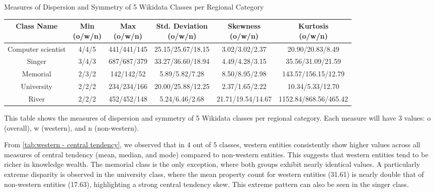 \begin{center}
\scriptsize
\begin{threeparttable}
\captionsetup{font=small}
\caption{Measures of Dispersion and Symmetry of 5 Wikidata Classes per Regional Category}
\label{tab:western - dispersion and symmetry}
\begin{tabular}{c | c c c c c} 

\toprule
    Class Name & \CellWithForceBreak{Min \\ (o/w/n)} & \CellWithForceBreak{Max \\ (o/w/n)} & \CellWithForceBreak{Std. Deviation \\ (o/w/n)} & \CellWithForceBreak{Skewness \\ (o/w/n)} & \CellWithForceBreak{Kurtosis \\ (o/w/n)} \\ [0.5ex] 
\midrule
    Computer scientist & 4/4/5 & 441/441/145 & 25.15/25.67/18.15 & 3.02/3.02/2.37 & 20.90/20.83/8.49 \\
    Singer & 3/4/3 & 687/687/379 & 33.27/36.60/18.94 & 4.49/4.28/3.15 & 35.56/31.09/21.59 \\
    Memorial & 2/3/2 & 142/142/52 & 5.89/5.82/7.28 & 8.50/8.95/2.98 & 143.57/156.15/12.79 \\
    University & 2/2/2 & 234/234/166 & 20.00/25.88/12.25 & 2.37/1.65/2.22 & 10.34/5.33/12.70 \\
    River & 2/2/2 & 452/452/148 & 5.24/6.46/2.68 & 21.71/19.54/14.67 & 1152.84/868.56/465.42 \\
    [1ex]
\bottomrule
\end{tabular}
\begin{tablenotes}
    \scriptsize
    \item{This table shows the measures of dispersion and symmetry of 5 Wikidata classes per regional category. Each measure will have 3 values: o (overall), w (western), and n (non-western).}
\end{tablenotes}
\end{threeparttable}
\end{center}

From \autoref{tab:western - central tendency}, we observed that in 4 out of 5 classes, western entities consistently show higher values across all measures of central tendency (mean, median, and mode) compared to non-western entities. This suggests that western entities tend to be richer in knowledge wealth. The memorial class is the only exception, where both groups exhibit nearly identical values. A particularly extreme disparity is observed in the university class, where the mean property count for western entities (31.61) is nearly double that of non-western entities (17.63), highlighting a strong central tendency skew. This extreme pattern can also be seen in the singer class.

